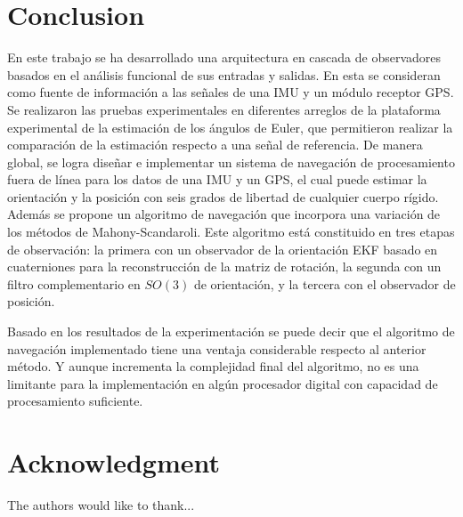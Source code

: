\documentclass[conference]{IEEEtran}
\begin{document}



\section{Conclusion}

En este trabajo se ha desarrollado una arquitectura en cascada de observadores basados en el análisis funcional de sus entradas y salidas. En esta se consideran como fuente de información a las señales de una IMU y un módulo receptor GPS. Se realizaron las pruebas experimentales en diferentes arreglos de la plataforma experimental de la estimación de los ángulos de Euler, que permitieron realizar la comparación de la estimación respecto a una señal de referencia. De manera global, se logra diseñar e implementar un sistema de navegación de procesamiento fuera de línea para los datos de una IMU y un GPS, el cual puede estimar la orientación y la posición con seis grados de libertad de cualquier cuerpo rígido. Además se propone un algoritmo de navegación que incorpora una variación de los métodos de Mahony-Scandaroli. Este algoritmo está constituido en tres etapas de observación: la primera con un observador de la orientación EKF basado en cuaterniones para la reconstrucción de la matriz de rotación, la segunda con un filtro complementario en $SO(3)$ de orientación, y la tercera con el observador de posición.
\par
Basado en los resultados de la experimentación se puede decir que el algoritmo de navegación implementado tiene una ventaja considerable respecto al anterior método. Y aunque incrementa la complejidad final del algoritmo, no es una limitante para la implementación en algún procesador digital con capacidad de procesamiento suficiente.\par


\section*{Acknowledgment}
The authors would like to thank...
\end{document}
